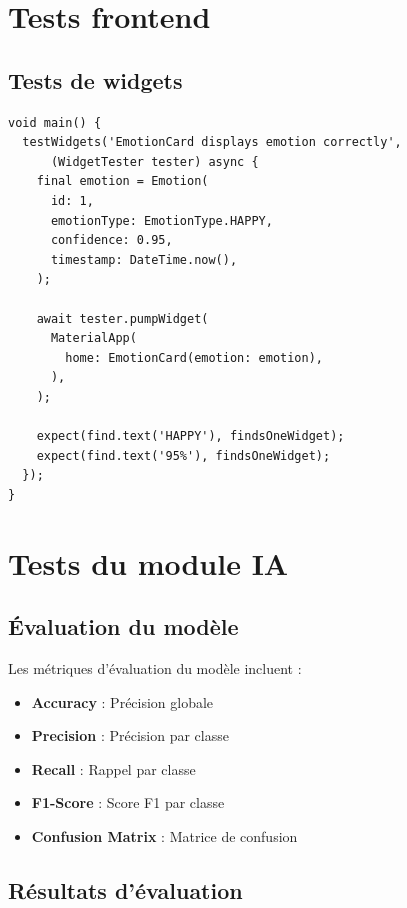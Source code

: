 \documentclass[a4paper,11pt]{report}
\begin{document}
\section{Tests frontend}

\subsection{Tests de widgets}

\begin{lstlisting}[style=dart, caption=Exemple de test de widget Flutter]
void main() {
  testWidgets('EmotionCard displays emotion correctly', 
      (WidgetTester tester) async {
    final emotion = Emotion(
      id: 1,
      emotionType: EmotionType.HAPPY,
      confidence: 0.95,
      timestamp: DateTime.now(),
    );
    
    await tester.pumpWidget(
      MaterialApp(
        home: EmotionCard(emotion: emotion),
      ),
    );
    
    expect(find.text('HAPPY'), findsOneWidget);
    expect(find.text('95%'), findsOneWidget);
  });
}
\end{lstlisting}

\section{Tests du module IA}

\subsection{Évaluation du modèle}

Les métriques d'évaluation du modèle incluent :

\begin{itemize}
    \item \textbf{Accuracy} : Précision globale
    \item \textbf{Precision} : Précision par classe
    \item \textbf{Recall} : Rappel par classe
    \item \textbf{F1-Score} : Score F1 par classe
    \item \textbf{Confusion Matrix} : Matrice de confusion
\end{itemize}

\subsection{Résultats d'évaluation}
\end{document}
